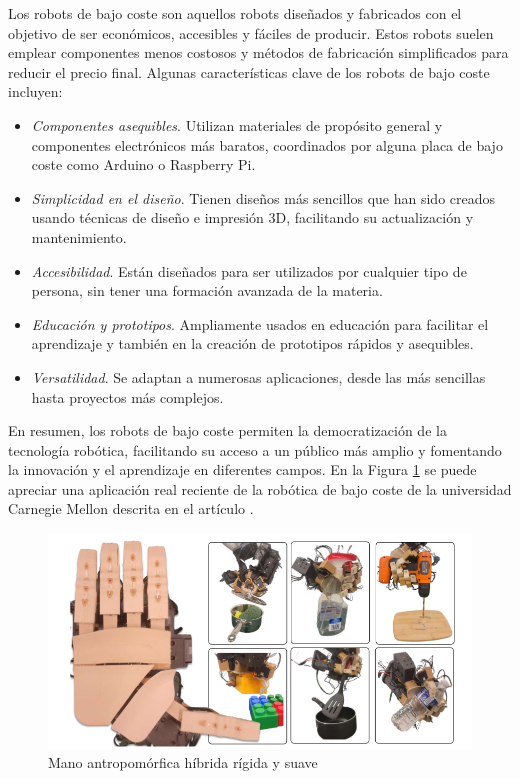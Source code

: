 Los robots de bajo coste son aquellos robots diseñados y fabricados con el objetivo de ser económicos, accesibles y fáciles de producir. Estos robots suelen emplear componentes menos costosos y métodos de fabricación simplificados para reducir el precio final. Algunas características clave de los robots de bajo coste incluyen:

\begin{itemize}
	\item \textit{Componentes asequibles}. Utilizan materiales de propósito general y componentes electrónicos más baratos, coordinados por alguna placa de bajo coste como Arduino o Raspberry Pi.
	\item \textit{Simplicidad en el diseño}. Tienen diseños más sencillos que han sido creados usando técnicas de diseño e impresión 3D, facilitando su actualización y mantenimiento.
	\item \textit{Accesibilidad}. Están diseñados para ser utilizados por cualquier tipo de persona, sin tener una formación avanzada de la materia.
	\item \textit{Educación y prototipos}. Ampliamente usados en educación para facilitar el aprendizaje y también en la creación de prototipos rápidos y asequibles.
	\item \textit{Versatilidad}. Se adaptan a numerosas aplicaciones, desde las más sencillas hasta proyectos más complejos.
	
\end{itemize}


En resumen, los robots de bajo coste permiten la democratización de la tecnología robótica, facilitando su acceso a un público más amplio y fomentando la innovación y el aprendizaje en diferentes campos. En la Figura \ref{fig:roblowcost} se puede apreciar una aplicación real reciente de la robótica de bajo coste de la universidad Carnegie Mellon descrita en el artículo \cite{shaw2024leap}.

\begin{figure} [h!]
	\begin{center}
		\includegraphics[width=16cm]{figs/handlowcost.png}
	\end{center}
	\caption{Mano antropomórfica híbrida rígida y suave} %
	\label{fig:roblowcost}
\end{figure}

